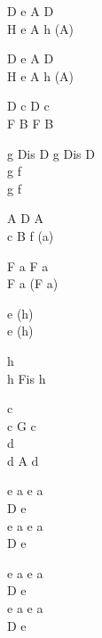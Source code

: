 \begin{chord}
    D e A D\\
    H e A h (A)

    D e A D\\
    H e A h (A)

    D c D c\\
    F B F B

    g Dis D g Dis D\\
    g f\\
    g f

    A D A\\
    c B f (a)

    F a F a\\
    F a (F a)

    e (h)\\
    e (h)

    h\\
    h Fis h

    c\\
    c G c\\
    d\\
    d A d

    e a e a\\
    D e\\
    e a e a\\
    D e

    e a e a\\
    D e\\
    e a e a\\
    D e
\end{chord}